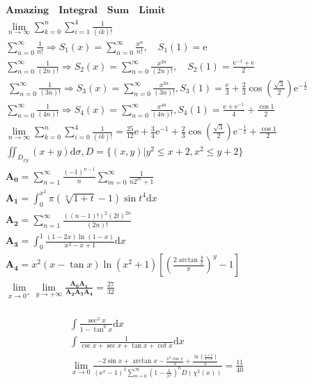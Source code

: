 \documentclass{article}
\begin{document}
\begin{align*}
    \mathbf{Amazing \quad Integral \quad Sum \quad Limit} \\
    \lim_{n \to \infty}\sum_{k = 0}^{n}\sum_{i = 1}^{4}\frac{1}{(ik)!} \\
    \sum_{n=0}^{\infty} \frac{1}{n!}  \Longrightarrow S_{1}(x) = \sum_{n=0}^{\infty}\frac{x^n}{n!}, \quad S_{1}(1) = \mathrm{e}\\ 
    \sum_{n=0}^\infty \frac{1}{(2n)!} \Longrightarrow S_{2}(x) = \sum_{n=0}^{\infty}{\frac{x^{2n}}{(2n)!}}, \quad S_{2}(1) = \frac{\mathrm{e}^{-1}+\mathrm{e}}{2}\\\ 
    \sum_{n=0}^\infty \frac{1}{(3n)!} \Longrightarrow S_{3}(x) = \sum_{n=0}^{\infty}{\frac{x^{3n}}{(3n)!}} ,S_{3}(1) = \frac{\mathrm{e}}{3}+\frac{2}{3}\cos\left(\frac{\sqrt{3}}{2}\right)\mathrm{e}^{-\frac{1}{2}} \\ 
    \sum_{n=0}^{\infty} \frac{1}{(4n)!} \Longrightarrow S_{4}(x) = \sum_{n=0}^{\infty}{\frac{x^{4n}}{(4n)!}} ,S_{4}(1) = \frac{\mathrm{e}+\mathrm{e}^{-1}}{4}+\frac{\cos 1}{2} \\
    \lim_{n \to \infty}\sum_{k = 0}^{n}\sum_{i = 0}^{4}\frac{1}{(ik)!} = \frac{25}{12}\mathrm{e} + \frac{3}{4}\mathrm{e}^{-1}+\frac{2}{3}\cos\left(\frac{\sqrt{3}}{2}\right)\mathrm{e}^{-\frac{1}{2}} + \frac{\cos 1}{2}\\
    \iint_{D_{xy}} (x+y)\mathrm{d}\sigma , D=\{(x,y)|y^2 \le x+2, x^2 \le y+2\} \\
    \mathbf{A_{0}} = \sum_{n=1}^\infty\frac{(-1)^{n-1}}{n}\sum_{m=0}^\infty\frac{1}{n2^m+1} \\
    \mathbf{A_{1}} = \int_{0}^{x^2} \pi(\sqrt[4]{1+t}-1)\sin t^4 \mathrm{d}x\\ 
    \mathbf{A_{2}} = \sum_{n=1}^\infty \frac{((n-1)!)^2(2t)^{2n}}{(2n)!} \\
    \mathbf{A_{3}} = \int_{0}^1\frac{(1-2x)\ln(1-x)}{x^2-x+1}\mathrm{d}x\\
    \mathbf{A_{4}} = x^2(x-\tan x)\ln(x^2+1)[\left(\frac{2\arctan \frac{y}{x}}{\pi}\right)^y-1] \\ 
    \lim_{x \to 0^{+}} \lim_{y \to +\infty}\frac{\mathbf{A_{0}}\mathbf{A_{1}}}{\mathbf{A_{2}}\mathbf{A_{3}}\mathbf{A_{4}}} = \frac{27}{32}\\
\end{align*}

\begin{align*}
    \int\frac{\sec^3 x}{1-\tan^6 x}\mathrm{d}x \\
    \int\frac{1}{\csc x+\sec x+\tan x +\cot x}\mathrm{d}x \\ 
    \lim_{x \to 0 }\frac{-2\sin x+\arctan x-\frac{x^3 \cos x}{3}+\frac{\ln(\frac{1+x}{1-x})}{2}}{(\mathrm{e}^{x}-1)^2 \sum_{n=0}^{\infty}\left(1-\frac{1}{x^2}\right)^n D(\chi^2(x))} =  \frac{11}{40} 
\end{align*}
\end{document}

